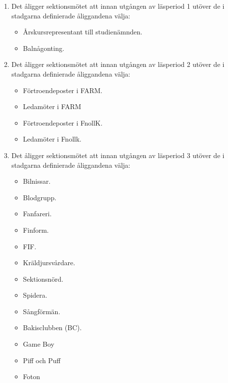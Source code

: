 \documentclass[11pt,a4paper]{article}
\begin{document}
\begin{enumerate}[\thesubsection .1]

  \item Det åligger sektionsmötet att innan utgången av läsperiod 1
  utöver de i stadgarna definierade åliggandena välja:
    \begin{itemize}
      \item Årskursrepresentant till studienämnden.
        \item Balnågonting.
    \end{itemize}

  \item Det åligger sektionsmötet att innan utgången av läsperiod 2
    utöver de i stadgarna definierade åliggandena välja:
    \begin{itemize}
      \item Förtroendeposter i FARM.
      \item Ledamöter i FARM
      \item Förtroendeposter i FnollK.
      \item Ledamöter i Fnollk.

    \end{itemize}

  \item Det åligger sektionsmötet att innan utgången av läsperiod 3
    utöver de i stadgarna definierade åliggandena välja:
    \begin{itemize}
      \item Bilnissar.
      \item Blodgrupp.
      \item Fanfareri.
      \item Finform.
      \item FIF.
      \item Kräldjursvårdare.
      \item Sektionsnörd.
      \item Spidera.
      \item Sångförmän.
      \item Bakisclubben (BC).
      \item Game Boy
      \item Piff och Puff
      \item Foton
    \end{itemize}


\end{enumerate}
\end{document}
